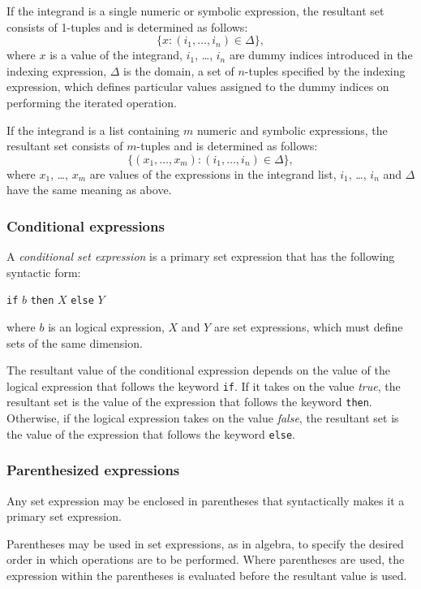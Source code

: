 \documentclass[10pt]{article}
\begin{document}
If the integrand is a single numeric or symbolic expression, the
resultant set consists of 1-tuples and is determined as follows:
$$\{x:(i_1,\dots,i_n)\in\Delta\},$$
\noindent where $x$ is a value of the integrand, $i_1$, \dots, $i_n$
are dummy indices introduced in the indexing expression, $\Delta$ is
the domain, a set of $n$-tuples specified by the indexing expression,
which defines particular values assigned to the dummy indices on
performing the iterated operation.

If the integrand is a list containing $m$ numeric and symbolic
expressions, the resultant set consists of $m$-tuples and is determined
as follows:
$$\{(x_1,\dots,x_m):(i_1,\dots,i_n)\in\Delta\},$$
where $x_1$, \dots, $x_m$ are values of the expressions in the
integrand list, $i_1$, \dots, $i_n$ and $\Delta$ have the same meaning
as above.

\subsubsection{Conditional expressions}

A {\it conditional set expression} is a primary set expression that has
the following syntactic form:

\medskip

\noindent\hfil
{\tt if} $b$ {\tt then} $X$ {\tt else} $Y$

\medskip

\noindent where $b$ is an logical expression, $X$ and $Y$ are set
expressions, which must define sets of the same dimension.

The resultant value of the conditional expression depends on the value
of the logical expression that follows the keyword {\tt if}. If it
takes on the value {\it true}, the resultant set is the value of the
expression that follows the keyword {\tt then}. Otherwise, if the
logical expression takes on the value {\it false}, the resultant set is
the value of the expression that follows the keyword {\tt else}.

\subsubsection{Parenthesized expressions}

Any set expression may be enclosed in parentheses that syntactically
makes it a primary set expression.

Parentheses may be used in set expressions, as in algebra, to specify
the desired order in which operations are to be performed. Where
parentheses are used, the expression within the parentheses is
evaluated before the resultant value is used.
\end{document}
